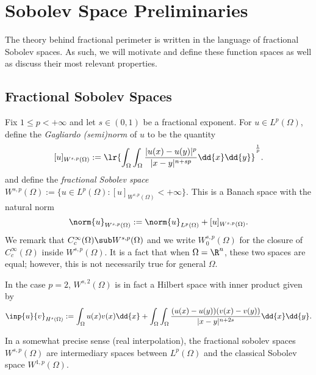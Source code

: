 \documentclass[../main.tex]{subfiles}
\begin{document}
\section{Sobolev Space Preliminaries}


The theory behind fractional perimeter is written in the language of fractional Sobolev spaces. As such, we will motivate and define these function spaces as well as discuss their most relevant properties. 


\subsection{Fractional Sobolev Spaces}

\begin{definition}\label{fracnorms}
    Fix $ 1\leq p <+\infty $ and let $ s\in (0,1) $ be a fractional exponent. For $ u\in L^{p}(\Omega) $, define the \textit{Gagliardo (semi)norm} of $ u $ to be the quantity
    \[
        [u]_{W^{s,p}(\Omega)} := \lr{\int_{\Omega}\int_{\Omega} \frac{|u(x)-u(y)|^{p}}{|x-y|^{n+sp}}\dd{x}\dd{y}}^{\frac{1}{p}}.
    \]
    and define the \textit{fractional Sobolev space} $ W^{s,p}(\Omega):= \{u\in L^{p}(\Omega):[u]_{W^{s,p}(\Omega)}<+\infty\} $. This is a Banach space with the natural norm
    \[
        \norm{u}_{W^{s,p}(\Omega)} := \norm{u}_{L^{p}(\Omega)}+[u]_{W^{s,p}(\Omega)}.
    \]
    We remark that $ C^{\infty}_{c}(\Omega)\sub W^{s,p}(\Omega) $ and we write $ W_{0}^{s,p}(\Omega) $ for the closure of $ C^{\infty}_{c}(\Omega) $ inside $ W^{s,p}(\Omega) $. It is a fact that when $ \Omega = \R^{n} $, these two spaces are equal; however, this is not necessarily true for general $ \Omega $.

    In the case $ p=2 $, $ W^{s,2}(\Omega) $ is in fact a Hilbert space with inner product given by 
    \[
        \inp{u}{v}_{H^{s}(\Omega)} := \int_{\Omega} u(x)v(x)\dd{x} + \int_{\Omega}\int_{\Omega} \frac{(u(x)-u(y))(v(x)-v(y))}{|x-y|^{n+2s}} \dd{x}\dd{y}.
    \]

    In a somewhat precise sense (real interpolation), the fractional sobolev spaces $ W^{s,p}(\Omega) $ are intermediary spaces between $ L^{p}(\Omega) $ and the classical Sobolev space $ W^{1,p}(\Omega) $.
\end{definition}
\end{document}
